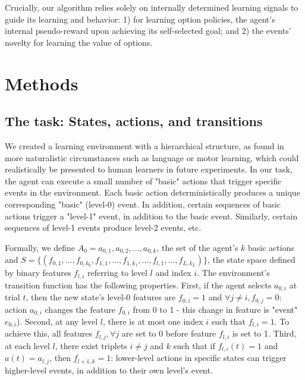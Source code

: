 \documentclass{article}
\begin{document}
Crucially, our algorithm relies solely on internally determined learning signals to guide its learning and behavior: 1) for learning option policies, the agent's internal pseudo-reward upon achieving its self-selected goal; and 2) the events' novelty for learning the value of options.


\section{Methods}
 
\subsection{The task: States, actions, and transitions}

We created a learning environment with a hierarchical structure, as found in more naturalistic circumstances such as language or motor learning, which could realistically be presented to human learners in future experiments. %
In our task, the agent can execute a small number of "basic" actions that trigger specific events in the environment. Each basic action deterministically produces a unique corresponding "basic" (level-0) event. In addition, certain sequences of basic actions trigger a "level-1" event, in addition to the basic event. Similarly, certain sequences of level-1 events produce level-2 events, etc.

Formally, we define $A_0 = a_{0, 1}, a_{0, 2}, \ldots, a_{0, k}$, the set of the agent's $k$ basic actions and $S = \{(f_{0, 1}, \ldots, f_{0, k_0}, f_{1, 1}, \ldots, f_{1, k_1}, \ldots, f_{l, 1}, \ldots, f_{L, k_L})\}$, the state space defined by binary features $f_{l, i}$ referring to level $l$ and index $i$. The environment's transition function has the following properties. First, if the agent selects $a_{0,i}$ at trial $t$, then the new state's level-0 features are $f_{0,i}=1$ and $\forall j \neq i, f_{0,j}=0$: action $a_{0, i}$ changes the feature $f_{0, i}$ from 0 to 1 - this change in feature is "event" $e_{0, i}$). Second, at any level $l$, there is at most one index $i$ such that $f_{l,i}=1$. To achieve this, all features $f_{l, j}, \forall j$ are set to 0 before feature $f_{l, i}$ is set to 1. Third, at each level $l$, there exist triplets $i \neq j$ and $k$ such that if $f_{l,i}(t)=1$ and $a(t)=a_{l,j}$, then $f_{l+1, k}=1$: lower-level actions in specific states can trigger higher-level events, in addition to their own level's event.
\end{document}
